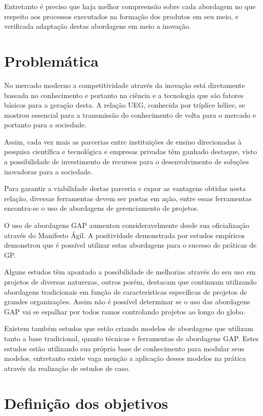 Entretanto é preciso que haja melhor compreensão sobre cada abordagem no que respeito aos processos executados na formação dos produtos em seu meio, e verificada adaptação destas abordagens em meio a inovação.

\section{Problemática}

No mercado moderno a competitividade através da inovação está diretamente baseada no conhecimento e portanto na ciência e a tecnologia que são fatores básicos para a geração desta. A relação UEG, conhecida por tríplice hélice, se mostrou essencial para a transmissão do conhecimento de volta para o mercado e portanto para a sociedade.

Assim, cada vez mais as parcerias entre instituições de ensino direcionadas à pesquisa científica e tecnológica e empresas privadas têm ganhado destaque, visto a possibilidade de investimento de recursos para o desenvolvimento de soluções inovadoras para a sociedade.

Para garantir a viabilidade destas parceria e expor as vantagens obtidas nesta relação, diversas ferramentas devem ser postas em ação, entre essas ferramentas encontra-se o uso de abordagens de gerenciamento de projetos.

O uso de abordagens GAP aumentou consideravelmente desde sua oficialização através do Manifesto Ágil. A positividade demonstrada por estudos empíricos demonstrou que é possível utilizar estas abordagens para o sucesso de práticas de GP.

Alguns estudos têm apontado a possibilidade de melhorias através do seu uso em projetos de diversas naturezas, outros porém, destacam que continuam utilizando abordagens tradicionais em função de características específicas de projetos de grandes organizações. Assim não é possível determinar se o uso das abordagens GAP vai se espalhar por todos ramos controlando projetos ao longo do globo.

Existem também estudos que estão criando modelos de abordagens que utilizam tanto a base tradicional, quanto técnicas e ferramentas de abordagens GAP. Estes estudos estão utilizando sua própria base de conhecimento para modular seus modelos, entretanto existe vaga menção a aplicação desses modelos na prática através da realização de estudos de caso.

\section{Definição dos objetivos}

